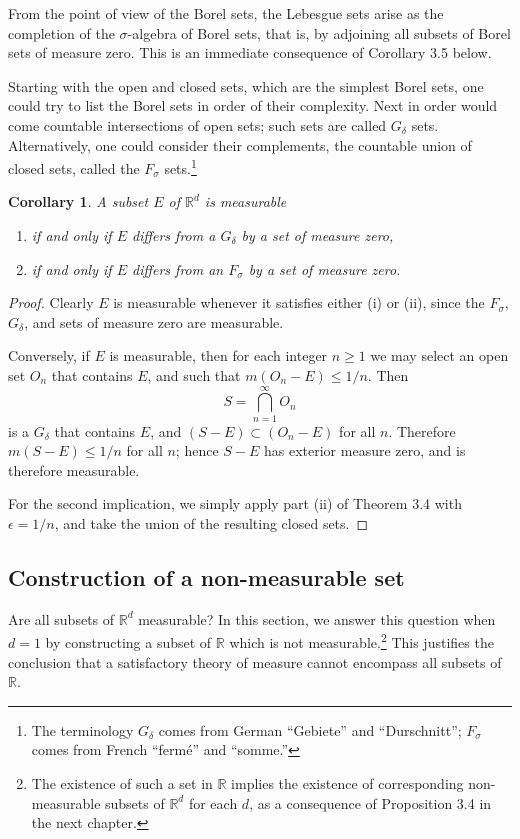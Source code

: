 \documentclass[11pt,openany]{book}
\newtheorem{corollary}[theorem]{Corollary}
\begin{document}
From the point of view of the Borel sets, the Lebesgue sets arise as the completion of the $\sigma$-algebra of Borel sets, that is, by adjoining all subsets of Borel sets of measure zero. This is an immediate consequence of Corollary 3.5 below.

Starting with the open and closed sets, which are the simplest Borel sets, one could try to list the Borel sets in order of their complexity. Next in order would come countable intersections of open sets; such sets are called $G_\delta$ sets. Alternatively, one could consider their complements, the countable union of closed sets, called the $F_\sigma$ sets.\footnote{The terminology $G_\delta$ comes from German ``Gebiete'' and ``Durschnitt''; $F_\sigma$ comes from French ``ferm\'e'' and ``somme.''}

\begin{corollary}
A subset $E$ of $\mathbb{R}^d$ is measurable
\begin{enumerate}
\item[(i)] if and only if $E$ differs from a $G_\delta$ by a set of measure zero,
\item[(ii)] if and only if $E$ differs from an $F_\sigma$ by a set of measure zero.
\end{enumerate}
\end{corollary}

\begin{proof}
Clearly $E$ is measurable whenever it satisfies either (i) or (ii), since the $F_\sigma$, $G_\delta$, and sets of measure zero are measurable.

Conversely, if $E$ is measurable, then for each integer $n\ge1$ we may select an open set $O_n$ that contains $E$, and such that $m(O_n-E)\le1/n$. Then
\[
 S=\bigcap_{n=1}^{\infty}O_n
\]
is a $G_\delta$ that contains $E$, and $(S-E)\subset(O_n-E)$ for all $n$. Therefore $m(S-E)\le1/n$ for all $n$; hence $S-E$ has exterior measure zero, and is therefore measurable.

For the second implication, we simply apply part (ii) of Theorem 3.4 with $\epsilon=1/n$, and take the union of the resulting closed sets.
\end{proof}

\subsection*{Construction of a non-measurable set}

Are all subsets of $\mathbb{R}^d$ measurable? In this section, we answer this question when $d=1$ by constructing a subset of $\mathbb{R}$ which is not measurable.\footnote{The existence of such a set in $\mathbb{R}$ implies the existence of corresponding non-measurable subsets of $\mathbb{R}^d$ for each $d$, as a consequence of Proposition 3.4 in the next chapter.} This justifies the conclusion that a satisfactory theory of measure cannot encompass all subsets of $\mathbb{R}$.
\end{document}
